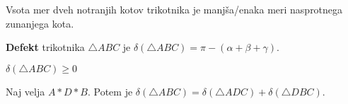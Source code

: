     \begin{posledica}
        Vsota mer dveh notranjih kotov trikotnika je manjša/enaka meri nasprotnega zunanjega kota.
    \end{posledica}

    \begin{definicija}
        \textbf{Defekt} trikotnika $\triangle ABC$ je $\delta(\triangle ABC)=\pi-(\alpha+\beta+\gamma)$.
    \end{definicija}

    \begin{posledica}
        $\delta(\triangle ABC)\geq 0$
    \end{posledica}

    \begin{trditev}
        Naj velja $A\ast D\ast B$. Potem je $\delta(\triangle ABC)=\delta(\triangle ADC)+\delta(\triangle DBC)$.
    \end{trditev}

